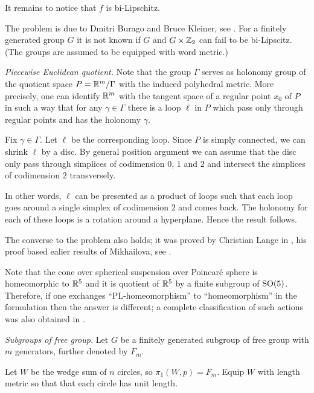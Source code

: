 It remains to notice that $f$ is bi-Lipschitz.

 The problem is due to 
Dmitri Burago 
and Bruce Kleiner,
see \cite{burago-kleiner}. 
For a finitely generated group $G$  
it is not known if $G$ and $G\times \mathbb{Z}_2$ can fail to be bi-Lipscitz.
(The groups are assumed to be equipped with word metric.)
 



\textit{Piecewise Euclidean quotient.}
Note that the group $\Gamma$ serves as holonomy group of the quotient space $P=\mathbb{R}^m/\Gamma$ with the induced polyhedral metric.
More precisely, one can identify $\mathbb{R}^m$ with the tangent space of a regular point $x_0$ of $P$ in such a way that
for any $\gamma\in\Gamma$ there is a loop $\ell$ in $P$ which pass only through regular points and has the holonomy $\gamma$.

Fix $\gamma\in\Gamma$. 
Let $\ell$ be the corresponding loop.
Since $P$ is simply connected, we can shrink $\ell$ by a disc.
By general position argument we can assume that the disc 
only pass through simplices of codimension $0$, $1$ and $2$
and intersect the simplices of codimension $2$ transversely.

In other words, $\ell$ can be presented as a product of 
loops such that each loop goes around a single simplex of codimension $2$ and comes back.
The holonomy for each of these loops is a rotation around a hyperplane.
Hence the result follows.

The converse to the problem also holds;
it was proved by Christian Lange in \cite{lange},
his proof based ealier results of 
Mikhailova, see \cite{mikhailova}.

Note that the cone over spherical suspension over Poincar\'e sphere is homeomorphic to $\mathbb{R}^5$ and it is quotient of $\mathbb{R}^5$ by a finite subgroup of $\mathrm{SO}(5)$. 
Therefore, if one exchanges ``PL-homeomorphism'' to ``homeomorphism'' in the formulation then the answer is different; 
a complete classification of such actions was also obtained in \cite{lange}.

\textit{Subgroups of free group.}
Let $G$ be a finitely generated subgroup of free group with $m$ generators, further denoted by $F_m$.

Let $W$ be the wedge sum of $n$ circles, 
so  $\pi_1(W,p)=F_m$.
Equip $W$ with length metric so that 
that each circle has unit length.

